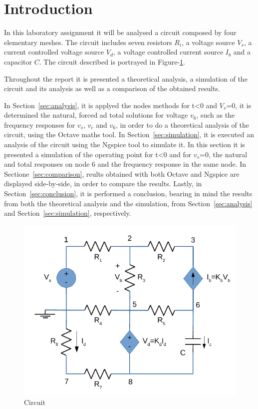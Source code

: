 \section{Introduction}
\label{sec:introduction}

In this laboratory assignment it will be analysed a circuit composed by four
elementary meshes. The circuit includes seven resistors $R_i$, a voltage source
$V_s$, a current controlled voltage source $V_d$, a voltage controlled current
source $I_b$ and a capacitor $C$. The circuit described is portrayed in
Figure-\ref{fig:circuit}.

Throughout the report it is presented a theoretical analysis, a simulation of the
circuit and its analysis as well as a comparison of the obtained results. \par
In Section~\ref{sec:analysis}, it is applyed the nodes methods for t<0 and $V_s$=0,
it is determined the natural, forced ad total solutions for voltage $v_6$, such as
the frequency responses for $v_s$, $v_c$ and $v_6$, in order to do a theoretical
analysis of the circuit, using the Octave maths tool.
In Section~\ref{sec:simulation}, it is executed an analysis of the circuit using
the Ngspice tool to simulate it. In this section it is presented a simulation of
the operating point for t<0 and for $v_s$=0, the natural and total responses on node 6
and the frequency response in the same node.
In Sectione~\ref{sec:comparison}, reults obtained with both Octave and Ngspice are
displayed side-by-side, in order to compare the results.
Lastly, in Section~\ref{sec:conclusion}, it is performed a conclusion, bearing in mind the
results from both the theoretical analysis and the simulation, from Section~\ref{sec:analysis}
and Section~\ref{sec:simulation}, respectively.


\begin{figure}[h] \centering
\includegraphics[width=0.7\linewidth]{circuit.pdf}
\caption{Circuit}
\label{fig:circuit}
\end{figure}

\newpage
